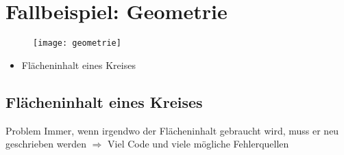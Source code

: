 



\subtitle{Kapitel 6: wie Funktionen funktionieren}
\titlegraphic{
	\begin{columns}
		\begin{column}{4cm}
			\vspace{1.5cm}
			\begin{center}
				{\huge Funktionen Fallbeispiel}
			\end{center}
		\end{column}
		\begin{column}{4cm}
		\vspace{-5mm}
			\begin{figure}
				\centering
			\end{figure}
		\end{column}
	\end{columns}}
\maketitle

\section{Fallbeispiel: Geometrie}
\begin{frame}
	\slidehead

	\begin{figure}
		\centering
		\texttt{[image: geometrie]}
	\end{figure}
	\vspace{-10mm}
	\begin{itemize}
		\item Flächeninhalt eines Kreises
	\end{itemize}
\end{frame}

\subsection{Flächeninhalt eines Kreises}
\begin{frame}
	\slidehead

	\begin{block}{Problem}
		Immer, wenn irgendwo der Flächeninhalt gebraucht wird, muss er neu geschrieben werden $\Rightarrow$ Viel Code und viele mögliche Fehlerquellen
	\end{block}
\end{frame}

